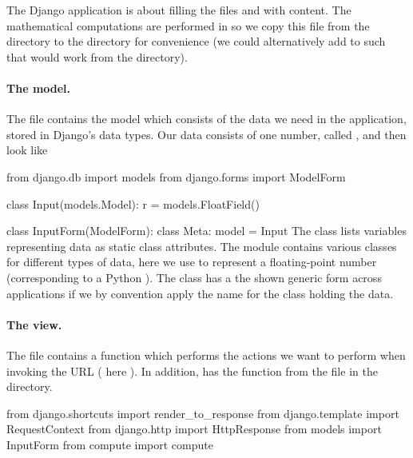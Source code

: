 \documentclass[%
oneside,                 %
final,                   %
10pt]{article}
\begin{document}
{{The Django application is about filling the files  and 
with content. The mathematical computations are performed in 
so we copy this file from the  directory to the  directory
for convenience (we could alternatively add  to  such that
 would work from the  directory).


\paragraph{The model.}
The  file contains the model which consists
of the data we need in the application, stored in Django's data types.
Our data consists of one number, called , and  then
look like

\bpypro
from django.db import models
from django.forms import ModelForm

class Input(models.Model):
    r = models.FloatField()

class InputForm(ModelForm):
    class Meta:
        model = Input
\epypro
The  class lists variables representing data as static class
attributes. The  module contains various classes
for different types of data, here we use  to represent
a floating-point number (corresponding to a Python ).
The  class has a the shown generic form across applications
if we by convention apply the name  for the class holding the data.


\paragraph{The view.}
The  file contains a function  which performs
the actions we want to perform when invoking
the URL ( here ).
In addition,  has the  function from
the  file in the  directory.

\bpypro
from django.shortcuts import render_to_response
from django.template import RequestContext
from django.http import HttpResponse
from models import InputForm
from compute import compute

}}
\end{document}
